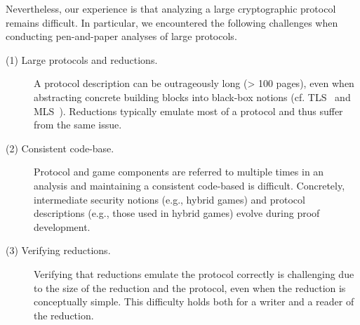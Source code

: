 Nevertheless, our experience is that analyzing a large cryptographic protocol remains difficult.
In particular, we encountered the following challenges when conducting pen-and-paper analyses of
large protocols.
\begin{description}
\item[(1) Large protocols and reductions.] A protocol description can be outrageously long (> 100 pages), even when abstracting concrete building blocks into black-box notions (cf. TLS~\cite{TLS13} and MLS~\cite{MLS}). Reductions typically emulate most of a protocol and thus suffer from the same issue.
\item[(2) Consistent code-base.] Protocol and game components are referred to multiple times in an analysis and maintaining a consistent code-based is difficult. Concretely, intermediate 
security notions (e.g., hybrid games) and protocol descriptions (e.g., those used in hybrid games) evolve
during proof development.
\item[(3) Verifying reductions.] Verifying that reductions emulate the protocol correctly is challenging due to the size of the reduction and the protocol, even when the reduction is conceptually simple. This difficulty holds both for a writer and a reader of the reduction.
\end{description}
